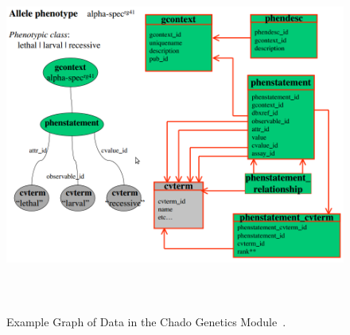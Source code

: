 \documentclass[12pt]{ucthesis}
\newcommand{\captionfonts}{\small\bf\ssp}
\begin{document}
\begin{figure}[h]
\begin{center}
\includegraphics[height=110mm]{chado-ex.png}
\captionfonts
\caption[Chado Genetics Module Example]{Example Graph of Data in the Chado Genetics Module~\cite{chado_new}.}
\label{fig:chado-ex}
\end{center}
\end{figure}
\end{document}
